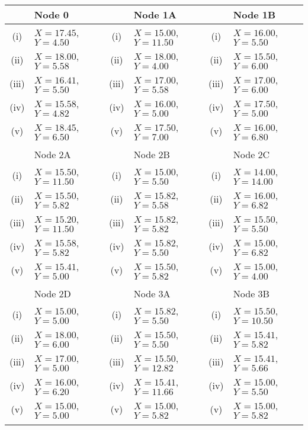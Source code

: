 \documentclass[a4paper,12pt]{article}
\begin{document}
  \begin{tabular}{||c|l||c|l||c|l||}
  	\hline  & Node 0 &   & Node 1A &  & Node 1B     \\  \hline
  	\hline (i) & $X= 17.45$, $Y= 4.50$ & (i) & $X= 15.00$, $Y= 11.50$ &  (i)  & $X= 16.00$, $Y  = 5.50$\\  \hline
  	\hline (ii)  & $X= 18.00$, $Y= 5.58$  &  (ii) & $X= 18.00$, $Y= 4.00$ & (ii) & $X= 15.50$, $Y  = 6.00 $ \\  \hline
  	\hline (iii) & $X= 16.41$, $Y  = 5.50$  & (iii) & $X= 17.00$, $Y  = 5.58$ & (iii) & $X= 17.00$, $Y  = 6.00$ \\  \hline
  	\hline (iv)  & $X= 15.58$, $Y =4.82 $  &  (iv) & $X= 16.00$, $Y  = 5.00 $ & (iv)  & $X= 17.50$, $Y= 5.00$\\  \hline
  \hline (v) & $X= 18.45$, $Y= 6.50$ & (v)  & $X= 17.50$, $Y= 7.00$ & (v) & $X= 16.00$, $Y= 6.80$\\  \hline & & & & & \\
  	\hline 
  	\hline  & Node 2A &   & Node 2B &  & Node 2C  \\  \hline
  	\hline (i) & $X= 15.50$, $Y= 11.50$ & (i)  & $X= 15.00 $, $Y  = 5.50 $  & (i)  & $X= 14.00$, $Y = 14.00$\\  \hline
  	\hline (ii)  & $X= 15.50$, $Y= 5.82$  &  (ii) &$X= 15.82$, $Y= 5.58$ & (ii) & $X= 16.00$, $Y  = 6.82 $ \\  \hline
  	\hline (iii) & $X= 15.20  $, $Y = 11.50 $  &  (iii) &$X= 15.82 $, $Y  = 5.82 $ &  (iii) & $X= 15.50$, $Y  = 5.50$ \\  \hline
  	\hline (iv)  & $X= 15.58$, $Y  = 5.82 $  & (iv) & $X= 15.82 $, $Y  = 5.50 $ & (iv)  & $X= 15.00$, $Y  = 6.82$\\  \hline
  	\hline (v) & $X= 15.41 $, $Y  = 5.00 $ & (v) & $X= 15.50$, $Y= 5.82$  &(v) & $X= 15.00$, $Y= 4.00$\\  \hline & & & & & \\
  	\hline 
  	\hline  & Node 2D &   & Node 3A &  & Node 3B   \\  \hline
  	\hline (i) & $X= 15.00$, $Y= 5.00$ &  (i) & $X= 15.82$, $Y= 5.50$  & (i)  & $X= 15.50$, $Y= 10.50$\\  \hline
  	\hline (ii)  & $X= 18.00$, $Y  = 6.00$  &  (ii) & $X= 15.50$, $Y= 5.50$ & (ii) & $X= 15.41$, $Y= 5.82$ \\  \hline
  	\hline (iii) & $X= 17.00$, $Y= 5.00$  & (iii) & $X= 15.50$, $Y =12.82 $ &(iii) & $X= 15.41$, $Y= 5.66$ \\  \hline
  	\hline (iv)  & $X= 16.00$, $Y= 6.20$  & (iv) & $X= 15.41$, $Y = 11.66 $ & (iv)  & $X= 15.00$, $Y= 5.50$\\  \hline
  \hline (v) & $X= 15.00$, $Y= 5.00$ & (v) & $X= 15.00$, $Y= 5.82$  &(v) & $X= 15.00$, $Y= 5.82$\\  \hline%
  & & & & & \\


\end{tabular}
\end{document}
